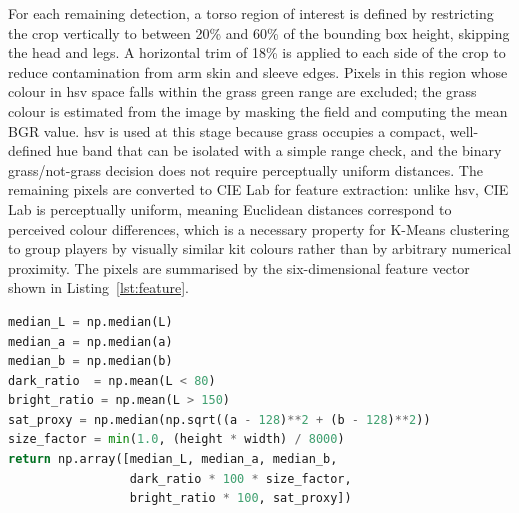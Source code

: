 For each remaining detection, a torso region of interest is defined by restricting the crop vertically to between 20\% and 60\% of the bounding box height, skipping the head and legs. A horizontal trim of 18\% is applied to each side of the crop to reduce contamination from arm skin and sleeve edges. Pixels in this region whose colour in \gls{hsv} space falls within the grass green range are excluded; the grass colour is estimated from the image by masking the field and computing the mean BGR value. \gls{hsv} is used at this stage because grass occupies a compact, well-defined hue band that can be isolated with a simple range check, and the binary grass/not-grass decision does not require perceptually uniform distances. The remaining pixels are converted to CIE Lab for feature extraction: unlike \gls{hsv}, CIE Lab is perceptually uniform, meaning Euclidean distances correspond to perceived colour differences, which is a necessary property for K-Means clustering to group players by visually similar kit colours rather than by arbitrary numerical proximity. The pixels are summarised by the six-dimensional feature vector shown in Listing~\ref{lst:feature}.

\begin{lstlisting}[language=Python, caption={Construction of the six-dimensional kit colour feature vector.}, label={lst:feature}]
median_L = np.median(L)
median_a = np.median(a)
median_b = np.median(b)
dark_ratio  = np.mean(L < 80)
bright_ratio = np.mean(L > 150)
sat_proxy = np.median(np.sqrt((a - 128)**2 + (b - 128)**2))
size_factor = min(1.0, (height * width) / 8000)
return np.array([median_L, median_a, median_b,
                 dark_ratio * 100 * size_factor,
                 bright_ratio * 100, sat_proxy])
\end{lstlisting}

